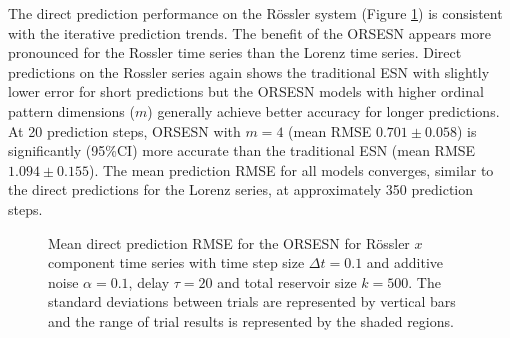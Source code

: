 The direct prediction performance on the Rössler system (Figure \ref{fig:ORSESN_rossler_direct}) is consistent with the iterative prediction trends. The benefit of the ORSESN appears more pronounced for the Rossler time series than the Lorenz time series.
Direct predictions on the Rossler series again shows the traditional ESN with slightly lower error for short predictions but the ORSESN models with higher ordinal pattern dimensions ($m$) generally achieve better accuracy for longer predictions. At 20 prediction steps, ORSESN with $m=4$ (mean RMSE $0.701\pm 0.058$) is significantly (95\%CI) more accurate than the traditional ESN (mean RMSE $1.094\pm 0.155$).
The mean prediction RMSE for all models converges, similar to the direct predictions for the Lorenz series, at approximately 350 prediction steps.


\begin{figure}

    \centering

    \caption{Mean direct prediction RMSE for the ORSESN for R\"ossler $x$ component time series with time step size $\Delta t=0.1$ and additive noise $\alpha=0.1$, delay $\tau=20$ and total reservoir size $k=500$. The standard deviations between trials are represented by vertical bars and the range of trial results is represented by the shaded regions.}
    \label{fig:ORSESN_rossler_direct}
\end{figure}



